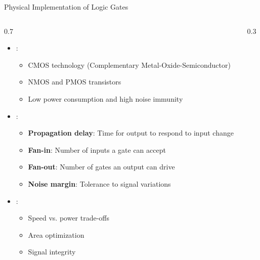 \begin{frame}{Physical Implementation of Logic Gates}
\begin{columns}[T,totalwidth=\textwidth]
\begin{column}{0.7\textwidth}
\begin{itemize}
\item {}:
\begin{itemize}
\item CMOS technology (Complementary Metal-Oxide-Semiconductor)
\item NMOS and PMOS transistors
\item Low power consumption and high noise immunity
\end{itemize}

\vspace{0.3cm}

\item {}:
\begin{itemize}
\item \textbf{Propagation delay}: Time for output to respond to input change
\item \textbf{Fan-in}: Number of inputs a gate can accept
\item \textbf{Fan-out}: Number of gates an output can drive
\item \textbf{Noise margin}: Tolerance to signal variations
\end{itemize}

\vspace{0.3cm}

\item {}:
\begin{itemize}
\item Speed vs. power trade-offs
\item Area optimization
\item Signal integrity
\end{itemize}
\end{itemize}
\end{column}

\begin{column}{0.3\textwidth}
\hspace*{-0.3cm} %
\scalebox{0.6}{}
\end{column}

\end{columns}
\end{frame}

